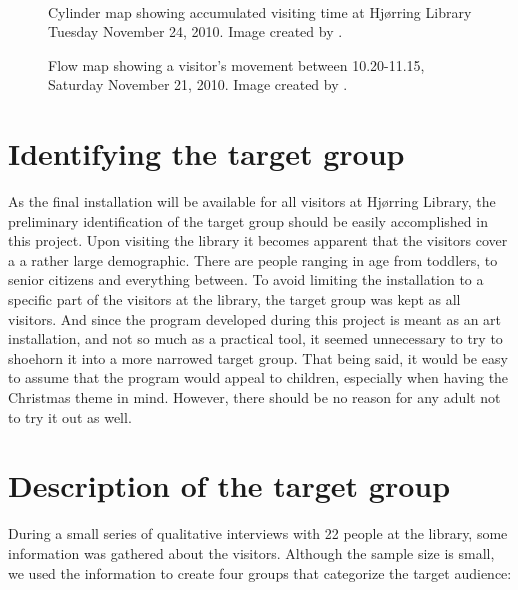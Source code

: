 \begin{figure}[htbp]
\begin{minipage}[b]{0.45\textwidth}
\end{minipage} \\ %
\begin{minipage}[t]{0.45\textwidth}
\caption{Cylinder map showing accumulated visiting time at Hj{\o}rring Library Tuesday November 24, 2010. Image created by \citep{hjoerring_study}.} %
\label{fig:library_cylindermap}
\end{minipage} \hfill
\begin{minipage}[t]{0.45\textwidth}
\caption{Flow map showing a visitor's movement between 10.20-11.15, Saturday November 21, 2010. Image created by \citep{hjoerring_study}.} %
\label{fig:library_flowmap}
\end{minipage}
\end{figure}

\section{Identifying the target group}
As the final installation will be available for all visitors at Hj{\o}rring Library, the preliminary identification of the target group should be easily accomplished in this project. Upon visiting the library it becomes apparent that the visitors cover a a rather large demographic. There are people ranging in age from toddlers, to senior citizens and everything between. To avoid limiting the installation to a specific part of the visitors at the library, the target group was kept as all visitors. And since the program developed during this project is meant as an art installation, and not so much as a practical tool, it seemed unnecessary to try to shoehorn it into a more narrowed target group. That being said, it would be easy to assume that the program would appeal to children, especially when having the Christmas theme in mind. However, there should be no reason for any adult not to try it out as well.

\section{Description of the target group}
During a small series of qualitative interviews with 22 people at the library, some information was gathered about the visitors. Although the sample size is small, we used the information to create four groups that categorize the target audience:

